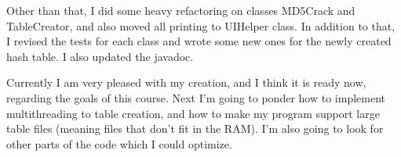\documentclass[a4paper, 11pt, finnish]{article}
\begin{document}
Other than that, I did some heavy refactoring on classes MD5Crack and TableCreator, and also moved all printing to UIHelper class. In addition to that, I revised the tests for each class and wrote some new ones for the newly created hash table. I also updated the javadoc.

Currently I am very pleased with my creation, and I think it is ready now, regarding the goals of this course. Next I'm going to ponder how to implement multithreading to table creation, and how to make my program support large table files (meaning files that don't fit in the RAM). I'm also going to look for other parts of the code which I could optimize.
\end{document}
